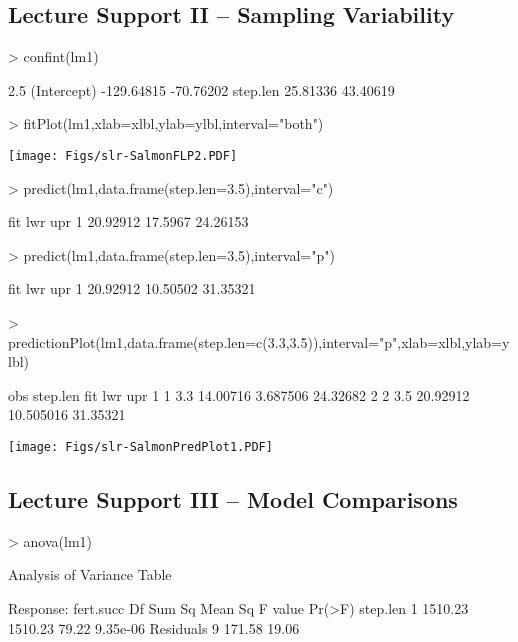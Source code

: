 \documentclass[a4paper]{article}
\begin{document}
\subsection{Lecture Support II -- Sampling Variability}
\begin{Schunk}
\begin{Sinput}
> confint(lm1)
\end{Sinput}
\begin{Soutput}
                 2.5 %    97.5 %
(Intercept) -129.64815 -70.76202
step.len      25.81336  43.40619
\end{Soutput}
\end{Schunk}

\begin{Schunk}
\begin{Sinput}
> fitPlot(lm1,xlab=xlbl,ylab=ylbl,interval="both")
\end{Sinput}
\end{Schunk}
\texttt{[image: Figs/slr-SalmonFLP2.PDF]}

\begin{Schunk}
\begin{Sinput}
> predict(lm1,data.frame(step.len=3.5),interval="c")
\end{Sinput}
\begin{Soutput}
       fit     lwr      upr
1 20.92912 17.5967 24.26153
\end{Soutput}
\begin{Sinput}
> predict(lm1,data.frame(step.len=3.5),interval="p")
\end{Sinput}
\begin{Soutput}
       fit      lwr      upr
1 20.92912 10.50502 31.35321
\end{Soutput}
\begin{Sinput}
> predictionPlot(lm1,data.frame(step.len=c(3.3,3.5)),interval="p",xlab=xlbl,ylab=ylbl)
\end{Sinput}
\begin{Soutput}
  obs step.len      fit       lwr      upr
1   1      3.3 14.00716  3.687506 24.32682
2   2      3.5 20.92912 10.505016 31.35321
\end{Soutput}
\end{Schunk}
\texttt{[image: Figs/slr-SalmonPredPlot1.PDF]}


\subsection{Lecture Support III -- Model Comparisons}
\begin{Schunk}
\begin{Sinput}
> anova(lm1)
\end{Sinput}
\begin{Soutput}
Analysis of Variance Table

Response: fert.succ
          Df  Sum Sq Mean Sq F value   Pr(>F)
step.len   1 1510.23 1510.23   79.22 9.35e-06
Residuals  9  171.58   19.06                 
\end{Soutput}
\end{Schunk}
\end{document}
